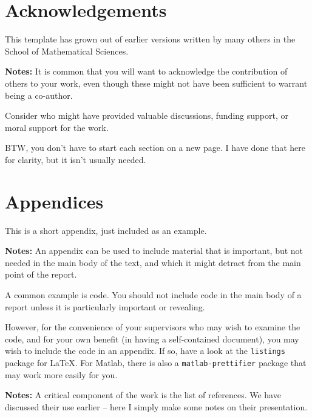 \documentclass[12pt,a4paper]{article}
\begin{document}
\clearpage
\section*{Acknowledgements}

This template has grown out of earlier versions written by many others
in the School of Mathematical Sciences. 

\vspace{10mm}
\noindent \hrulefill

{\bf Notes:} It is common that you will want to acknowledge the
contribution of others to your work, even though these might not have
been sufficient to warrant being a co-author.

Consider who might have provided valuable discussions, funding
support, or moral support for the work. 

BTW, you don't have to start each section on a new page. I have done
that here for clarity, but it isn't usually needed.

\appendix

\section{Appendices}

This is a short appendix, just included as an example. 

\vspace{10mm}
\noindent \hrulefill

{\bf Notes:} 
An appendix can be used to include material that is important, but not
needed in the main body of the text, and which it might detract from
the main point of the report. 

A common example is code.  You should not include code in the main
body of a report unless it is particularly important or revealing.

However, for the convenience of your supervisors who may wish to
examine the code, and for your own benefit (in having a self-contained
document), you may wish to include the code in an appendix. If so,
have a look at the {\tt listings} package for \LaTeX. For Matlab,
there is also a {\tt matlab-prettifier} package that may work more
easily for you. 

\clearpage



\vspace{10mm}
\noindent \hrulefill

{\bf Notes:} 
A critical component of the work is the list of references. We have
discussed their use earlier -- here I simply make some notes on their
presentation. 
\end{document}
